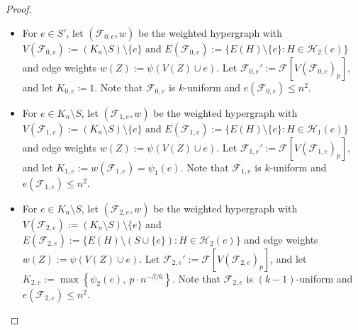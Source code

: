 \documentclass[11pt]{article}
\numberwithin{equation}{section}
\newcommand{\mc}[1]{\mathcal{#1}}
\newcounter{i}
\theoremstyle{plain}
\theoremstyle{plain} %
\theoremstyle{definition}
\newcommand{\cF}{\mathcal{F}}
\begin{document}
\begin{proof}
\begin{itemize}
\item For $e\in S'$, let $(\cF_{0,e}, w)$ be the weighted hypergraph with $V(\cF_{0,e}):= (K_n\setminus S)\setminus \{e\}$ and $E(\cF_{0,e}):=\{E(H)\setminus \{e\}: H\in \mc{H}_2(e)\}$ and edge weights $w(Z):= \psi(V(Z)\cup e)$.
Let $\cF_{0,e}':= \cF[V(\cF_{0,e})_p]$, and let $K_{0,e}\coloneqq 1$. 
Note that $\cF_{0,e}$ is $k$-uniform and $e(\cF_{0,e}) \leq n^2$.

\item For $e\in K_n\setminus S$, let $(\cF_{1,e}, w)$ be the weighted hypergraph with $V(\cF_{1,e}):= (K_n\setminus S)\setminus \{e\}$ and $E(\cF_{1,e}):=\{E(H)\setminus \{e\}: H\in \mc{H}_1(e)\}$ and edge weights $w(Z):= \psi(V(Z)\cup e)$.
Let $\cF_{1,e}':= \cF[V(\cF_{1,e})_p]$, and let $K_{1,e}:= w(\cF_{1,e})=\psi_1(e)$.
Note that $\cF_{1,e}$ is $k$-uniform and $e(\cF_{1,e}) \leq n^2$.

\item For $e\in K_n\setminus S$, let $(\cF_{2,e}, w)$ be the weighted hypergraph with $V(\cF_{2,e}):= (K_n\setminus S)\setminus \{e\}$ and $E(\cF_{2,e}):=\{E(H)\setminus (S\cup \{e\}): H\in \mc{H}_2(e)\}$ and edge weights $w(Z):= \psi(V(Z)\cup e)$.
Let $\cF_{2,e}':= \cF[V(\cF_{2,e})_p]$, and let $K_{2,e}:=\max\left\{\psi_2(e),~p\cdot n^{-\beta/6}\right\}$. 
Note that $\cF_{2,e}$ is $(k - 1)$-uniform and $e(\cF_{2,e}) \leq n^2$.



\end{itemize}


\end{proof}
\end{document}
